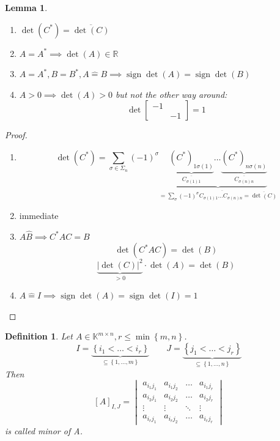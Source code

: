 \documentclass[a4paper]{article}
\newcounter{lecref}[section]
\numberwithin{lecref}{section}
\newtheorem{definition}[lecref]{Definition}
\newtheorem{lemma}[lecref]{Lemma}
\newcommand{\set}[1]{\left\{#1\right\}}
\newcommand{\card}[1]{\left|#1\right|}
\DeclareMathOperator{\sign}{sign}
\begin{document}
\begin{lemma}
  \begin{enumerate}
    \item $\det(C^*) = \overline{\det(C)}$
    \item $A = A^* \implies \det(A) \in \mathbb R$
    \item $A = A^*, B = B^*, A \hat= B \implies \sign{\det(A)} = \sign{\det(B)}$
    \item $A > 0 \implies \det(A) > 0$
      but not the other way around:
      \[ \det\begin{bmatrix} -1 & \\ & -1 \end{bmatrix} = 1 \]
  \end{enumerate}
\end{lemma}

\begin{proof}
  \begin{enumerate}
    \item
      \[ \det(C^*) = \sum_{\sigma \in \Sigma_n} (-1)^\sigma \underbrace{\underbrace{(C^*)_{1 \sigma(1)}}_{\overline{C_{\sigma(1) 1}}} \ldots \underbrace{(C^*)_{n \sigma(n)}}_{\overline{C_{\sigma(n) n}}}}_{= \overline{\sum_{\sigma} (-1)^\sigma C_{\sigma(1) 1} \ldots C_{\sigma(n) n} = \overline{\det(C)} }} \]
    \item immediate
    \item $A \hat B \implies C^* AC = B$
      \[ \det(C^* AC) = \det(B) \]
      \[ \underbrace{\card{\det(C)}^2}_{>0} \cdot \det(A) = \det(B) \]
    \item $A \hat= I \implies \sign{\det(A)} = \sign{\det(I)} = 1$
  \end{enumerate}
\end{proof}

\begin{definition} %
  Let $A \in \mathbb K^{m \times n}, r \leq \min\set{m,n}$.
  \[ I = \underbrace{\set{i_1 < \ldots < i_r}}_{\subseteq \set{1, \ldots, m}} \qquad J = \underbrace{\set{j_1 < \ldots < j_r}}_{\subseteq \set{1, \ldots, n}} \]
  Then
  \[
    \left[A\right]_{I,J} =
    \begin{vmatrix}
      a_{i_1 j_1} & a_{i_1 j_2} & \ldots & a_{i_1 j_r} \\
      a_{i_2 j_1} & a_{i_2 j_2} & \ldots & a_{i_2 j_r} \\
      \vdots & \vdots & \ddots & \vdots \\
      a_{i_r j_1} & a_{i_r j_2} & \ldots & a_{i_r j_r}
    \end{vmatrix}
  \]
  is called \emph{minor of A}.
\end{definition}
\end{document}
